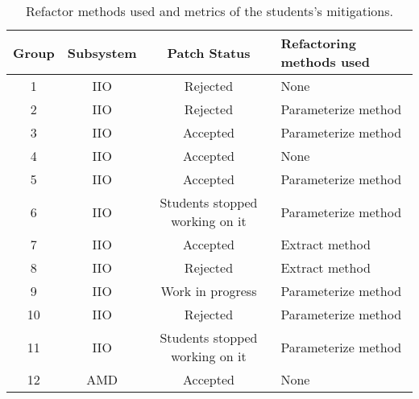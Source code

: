 \begin{table}
\begin{tabular}{ | c | c | c | m{6em} | }

\hline

\textbf{Group} & \textbf{Subsystem} & \textbf{Patch Status} & \textbf{Refactoring methods used} 
\\ \hline 

1 & IIO & Rejected & None \\ \hline
2 & IIO & Rejected & Parameterize method \\ \hline
3 & IIO & Accepted & Parameterize method \\ \hline
4 & IIO & Accepted & None \\ \hline
5 & IIO & Accepted  & Parameterize method \\ \hline
6 & IIO & Students stopped working on it & Parameterize method \\ \hline
7 & IIO & Accepted  & Extract method \\ \hline
8 & IIO & Rejected & Extract method \\ \hline
9 & IIO & Work in progress & Parameterize method \\ \hline
10 & IIO & Rejected & Parameterize method \\ \hline
11 & IIO & Students stopped working on it & Parameterize method \\ \hline
12 & AMD & Accepted & None \\ \hline

\hline
\end{tabular}
\caption{Refactor methods used and metrics of the students's mitigations.}
\label{tab:stu}
\end{table}

